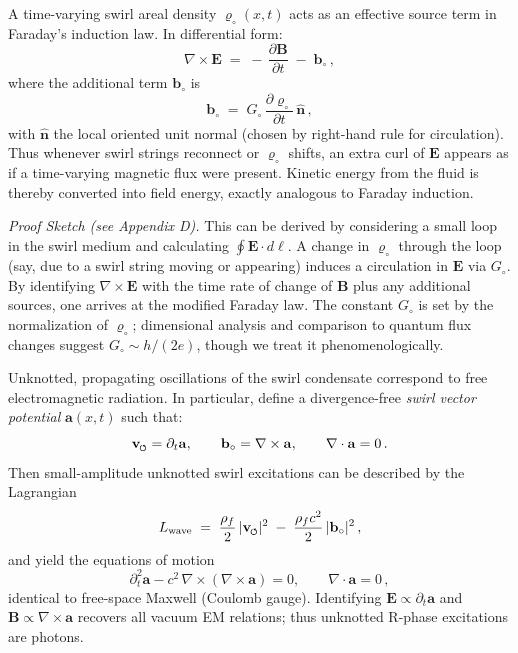 \documentclass[reprint,aps,onecolumn,nofootinbib]{revtex4-2}
\newcommand{\swirlarrow}{%
    \mathchoice{\mkern-2mu\scriptstyle\boldsymbol{\circlearrowleft}}%
    {\mkern-2mu\scriptstyle\boldsymbol{\circlearrowleft}}%
    {\mkern-2mu\scriptscriptstyle\boldsymbol{\circlearrowleft}}%
    {\mkern-2mu\scriptscriptstyle\boldsymbol{\circlearrowleft}}%
}
\newcommand{\vswirl}{\mathbf{v}_{\swirlarrow}}
\begin{document}
	\begin{tcolorbox}[title=Theorem 4.1: Swirl-Induced Electromotive Force]
		A time-varying swirl areal density $\varrho_{\circ}(x,t)$ acts as an effective source term in Faraday’s induction law. In differential form:
		\[
			\nabla \times \mathbf{E} \;=\; -\,\frac{\partial \mathbf{B}}{\partial t}\;-\; \mathbf{b}_{\circ}\,,
		\]
		where the additional term $\mathbf{b}_{\circ}$ is
		\[
			\mathbf{b}_{\circ} \;=\; G_{\circ}\,\frac{\partial \varrho_{\circ}}{\partial t}\,\hat{\mathbf{n}}\,,
		\]
		with $\hat{\mathbf{n}}$ the local oriented unit normal (chosen by right-hand rule for circulation). Thus whenever swirl strings reconnect or $\varrho_{\circ}$ shifts, an extra curl of $\mathbf{E}$ appears as if a time-varying magnetic flux were present. Kinetic energy from the fluid is thereby converted into field energy, exactly analogous to Faraday induction.
	\end{tcolorbox}

	\noindent \textit{Proof Sketch (see Appendix D).} This can be derived by considering a small loop in the swirl medium and calculating $\oint \mathbf{E}\cdot d\ell$. A change in $\varrho_{\circ}$ through the loop (say, due to a swirl string moving or appearing) induces a circulation in $\mathbf{E}$ via $G_{\circ}$. By identifying $\nabla \times \mathbf{E}$ with the time rate of change of $\mathbf{B}$ plus any additional sources, one arrives at the modified Faraday law. The constant $G_{\circ}$ is set by the normalization of $\varrho_{\circ}$; dimensional analysis and comparison to quantum flux changes suggest $G_{\circ}\sim h/(2e)$, though we treat it phenomenologically.

	\begin{tcolorbox}[title=Corollary 4.2: Photon as a Swirl Wave]
		Unknotted, propagating oscillations of the swirl condensate correspond to free electromagnetic radiation. In particular, define a divergence-free \emph{swirl vector potential} $\mathbf{a}(x,t)$ such that:
		\[
			\vswirl = \partial_t \mathbf{a}, \qquad
			\mathbf{b}_{\circ} = \nabla \times \mathbf{a}, \qquad
			\nabla\cdot \mathbf{a} = 0\,.
		\]
		Then small-amplitude unknotted swirl excitations can be described by the Lagrangian
		\[
			L_{\text{wave}} \;=\; \frac{\rho_f}{2}\,|\vswirl|^2 \;-\; \frac{\rho_f c^2}{2}\,|\mathbf{b}_{\circ}|^2\,,
		\]
		and yield the equations of motion
		\[
			\partial_t^2 \mathbf{a} - c^2 \,\nabla \times (\nabla \times \mathbf{a}) = 0, \qquad \nabla \cdot \mathbf{a} = 0\,,
		\]
		identical to free-space Maxwell (Coulomb gauge). Identifying $\mathbf{E} \propto \partial_t \mathbf{a}$ and $\mathbf{B}\propto \nabla \times \mathbf{a}$ recovers all vacuum EM relations; thus unknotted R-phase excitations are photons.
	\end{tcolorbox}
\end{document}
